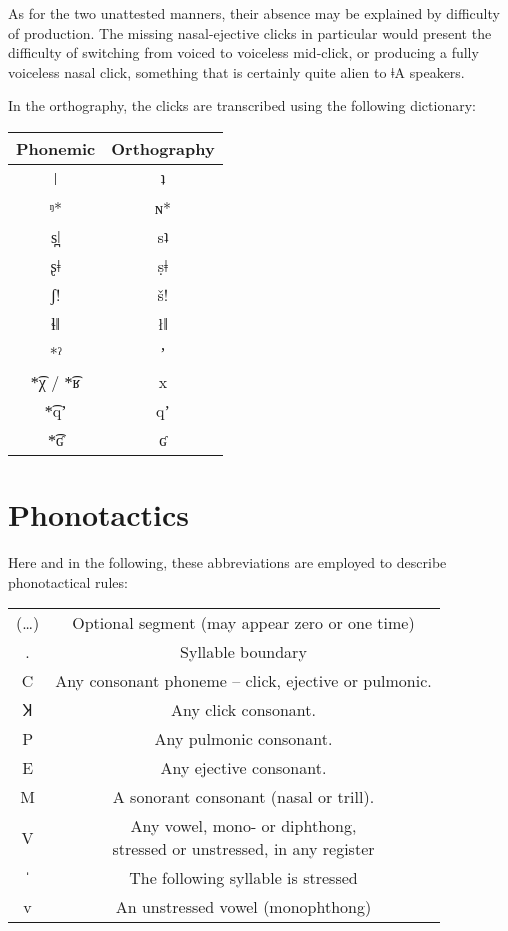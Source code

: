 \documentclass[11pt,a5paper]{book}
\newcommand{\qcn}[1]{\textcolor{AccentText}{\large#1}}
\newcommand{\langname}{\qcn{ǂA}}
\begin{document}
As for the two unattested manners, their absence may be explained by difficulty of production. The missing nasal-ejective clicks in particular would present the difficulty of switching from voiced to voiceless mid-click, or producing a fully voiceless nasal click, something that is certainly quite alien to \langname{} speakers.

In the orthography, the clicks are transcribed using the following dictionary:

\begin{center}
\begin{tabular}{c|c}
Phonemic & Orthography \\ \hline \hline
ǀ & \qcn{ʇ}\\
ᵑ* & \qcn{ɴ*}\\
s̪ǀ & \qcn{sʇ} \\
ʂǂ & \qcn{ṣǂ} \\
ʃ! &	\qcn{š!} \\
ɬǁ & \qcn{łǁ}\\
*ˀ & \qcn{*ʼ}\\
*͡χ / *͡ʁ & \qcn{*x} \\
*͡qʼ & \qcn{*qʼ}\\
*͡ʛ & \qcn{*ʛ}
\end{tabular}
\end{center}




\section{Phonotactics}

\newcommand{\stress}{ˈ}

Here and in the following, these abbreviations are employed to describe phonotactical rules:

\begin{center}
\begin{tabular}{cc}
	(\ldots) & Optional segment (may appear zero or one time)\\
	. & Syllable boundary \\
	C & Any consonant phoneme -- click, ejective or pulmonic.\\
	Ʞ & Any click consonant. \\
	P & Any pulmonic consonant. \\
	E & Any ejective consonant.\\
	M & A sonorant consonant (nasal or trill).\\
	V & \makecell{Any vowel, mono- or diphthong, \\stressed or unstressed, in any register} \\
 \stress{} & The following syllable is stressed \\
	v & An unstressed vowel (monophthong) 
\end{tabular}
\end{center}
\end{document}
